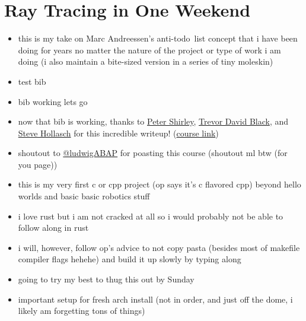 \clearpage
\section{Ray Tracing in One Weekend}

\begin{itemize}
    \item this is my take on Marc Andreessen's anti-todo\footnotemark\ list
        concept that i have been doing for years no matter the nature of the 
        project or type of work i am doing (i also maintain a bite-sized 
        version in a series of tiny moleskin)
    \item test bib \cite{Shirley2024RTW1}
    \item bib working lets go
    \item now that bib is working, thanks to 
        \textcolor{blue}{\href{https://github.com/petershirley}{Peter Shirley}},
        \textcolor{blue}{\href{https://github.com/trevordblack}{Trevor David Black}}, and
        \textcolor{blue}{\href{https://github.com/hollasch}{Steve Hollasch}}
        for this incredible writeup! 
        (\textcolor{blue}{\href{https://raytracing.github.io/books/RayTracingInOneWeekend.html}{course link}})
    \item shoutout to 
        \textcolor{blue}{\href{https://x.com/ludwigABAP}{@ludwigABAP}}
        for poasting this course (shoutout ml btw (for you page))
    \item this is my very first c or cpp project (op says it's c flavored cpp) 
        beyond hello worlds and basic basic robotics stuff
    \item i love rust but i am not cracked at all so i would probably not be
        able to follow along in rust
    \item i will, however, follow op's advice to not copy pasta (besides most of 
        makefile compiler flags hehehe) and build it up slowly by typing along
    \item going to try my best to thug this out by Sunday
    \item important setup for fresh arch install (not in order, and just off the
        dome, i likely am forgetting tons of things)

\end{itemize}
